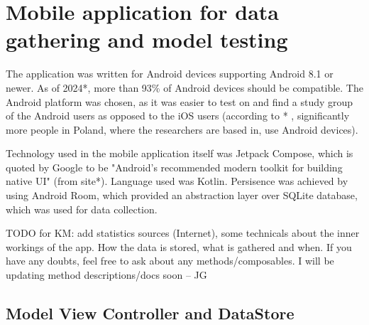 
\section{Mobile application for data gathering and model testing}

The application was written for Android devices supporting Android 8.1 or newer. As of 2024*, more than 93\% of Android devices should be compatible. The Android platform was chosen, as it was easier to test on and find a study group of the Android users as opposed to the iOS users (according to * , significantly more people in Poland, where the researchers are based in, use Android devices).

Technology used in the mobile application itself was Jetpack Compose, which is quoted by Google to be "Android’s recommended modern toolkit for building native UI" (from site*). Language used was Kotlin. Persisence was achieved by using Android Room, which provided an abstraction layer over SQLite database, which was used for data collection.

TODO for KM: add statistics sources (Internet), some technicals about the inner workings of the app. How the data is stored, what is gathered and when. If you have any doubts, feel free to ask about any methods/composables. I will be updating method descriptions/docs soon -- JG

\subsection{Model View Controller and DataStore}

